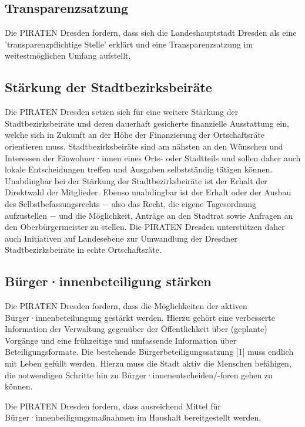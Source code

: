 \documentclass[a4paper, 11pt]{article}
\begin{document}
\subsection{Transparenzsatzung}
Die PIRATEN Dresden fordern, dass sich die Landeshauptstadt Dresden als eine 'transparenzpflichtige Stelle' erklärt und eine Transparenzsatzung im weitestmöglichen Umfang aufstellt.


\subsection{Stärkung der Stadtbezirksbeiräte}
Die PIRATEN Dresden setzen sich für eine weitere Stärkung der Stadtbezirksbeiräte und deren dauerhaft gesicherte finanzielle Ausstattung ein, welche sich in Zukunft an der Höhe der Finanzierung der Ortschaftsräte orientieren muss. Stadtbezirksbeiräte sind am nähsten an den Wünschen und Interessen der Einwohner·innen eines Orts- oder Stadtteils und sollen daher auch lokale Entscheidungen treffen und Ausgaben selbstständig tätigen können. Unabdingbar bei der Stärkung der Stadtbezirksbeiräte ist der Erhalt der Direktwahl der Mitglieder. Ebenso unabdingbar ist der Erhalt oder der Ausbau des Selbstbefassungsrechts $-$ also das Recht, die eigene Tagesordnung aufzustellen $-$ und die Möglichkeit, Anträge an den Stadtrat sowie Anfragen an den Oberbürgermeister zu stellen. Die PIRATEN Dresden unterstützen daher auch Initiativen auf Landesebene zur Umwandlung der Dresdner Stadtbezirksbeiräte in echte Ortschaftsräte.


\subsection{Bürger·innenbeteiligung stärken}
Die PIRATEN Dresden fordern, dass die Möglichkeiten der aktiven Bürger·innenbeteilungung gestärkt werden. Hierzu gehört eine verbesserte Information der Verwaltung gegenüber der Öffentlichkeit über (geplante) Vorgänge und eine frühzeitige und umfassende Information über Beteiligungsformate. Die bestehende Bürgerbeteiligungssatzung [1] muss endlich mit Leben gefüllt werden. Hierzu muss die Stadt aktiv die Menschen befähigen, die notwendigen Schritte hin zu Bürger·innenentscheiden/-foren gehen zu können.\newline

Die PIRATEN Dresden fordern, dass ausreichend Mittel für Bürger·innenbeiligungsmaßnahmen im Haushalt bereitgestellt werden,
\end{document}
